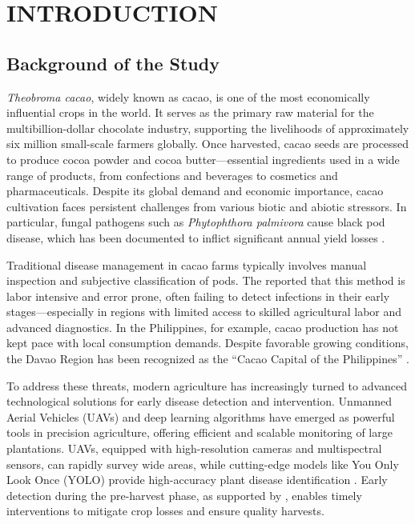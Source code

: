 \chapter{INTRODUCTION}

{\baselineskip

\section{Background of the Study}

\textit{Theobroma cacao}, widely known as cacao, is one of the most economically influential crops in the world. It serves as the primary raw material for the multibillion-dollar chocolate industry, supporting the livelihoods of approximately six million small-scale farmers globally. Once harvested, cacao seeds are processed to produce cocoa powder and cocoa butter—essential ingredients used in a wide range of products, from confections and beverages to cosmetics and pharmaceuticals. Despite its global demand and economic importance, cacao cultivation faces persistent challenges from various biotic and abiotic stressors. In particular, fungal pathogens such as \textit{Phytophthora palmivora} cause black pod disease, which has been documented to inflict significant annual yield losses \cite{Avila2023}.

Traditional disease management in cacao farms typically involves manual inspection and subjective classification of pods. The \cite{PhilCacaoRoadmap2021} reported that this method is labor intensive and error prone, often failing to detect infections in their early stages—especially in regions with limited access to skilled agricultural labor and advanced diagnostics. In the Philippines, for example, cacao production has not kept pace with local consumption demands. Despite favorable growing conditions, the Davao Region has been recognized as the ``Cacao Capital of the Philippines'' \cite{PCAF2021}.

To address these threats, modern agriculture has increasingly turned to advanced technological solutions for early disease detection and intervention. Unmanned Aerial Vehicles (UAVs) and deep learning algorithms have emerged as powerful tools in precision agriculture, offering efficient and scalable monitoring of large plantations. UAVs, equipped with high-resolution cameras and multispectral sensors, can rapidly survey wide areas, while cutting-edge models like You Only Look Once (YOLO) provide high-accuracy plant disease identification \cite{Vyas2023}. Early detection during the pre-harvest phase, as supported by \cite{Upadhyay2025,Yadav2024}, enables timely interventions to mitigate crop losses and ensure quality harvests.

}
